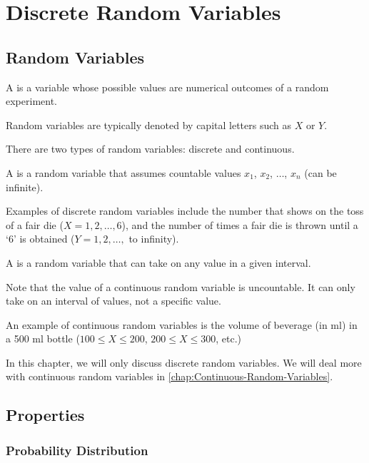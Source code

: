 \chapter{Discrete Random Variables}

\section{Random Variables}

\begin{definition}
    A  is a variable whose possible values are numerical outcomes of a random experiment.
\end{definition}

Random variables are typically denoted by capital letters such as $X$ or $Y$.

There are two types of random variables: discrete and continuous.

\begin{definition}
    A  is a random variable that assumes countable values $x_1$, $x_2$, $\dots$, $x_n$ (can be infinite).
\end{definition}

Examples of discrete random variables include the number that shows on the toss of a fair die ($X = 1, 2, \dots, 6$), and the number of times a fair die is thrown until a `6' is obtained ($Y = 1, 2, \dots,$ to infinity).

\begin{definition}
    A  is a random variable that can take on any value in a given interval.
\end{definition}

Note that the value of a continuous random variable is uncountable. It can only take on an interval of values, not a specific value.

An example of continuous random variables is the volume of beverage (in ml) in a 500 ml bottle ($100 \leq X \leq 200$, $200 \leq X \leq 300$, etc.)

In this chapter, we will only discuss discrete random variables. We will deal more with continuous random variables in \SS\ref{chap:Continuous-Random-Variables}.

\section{Properties}

\subsection{Probability Distribution}

